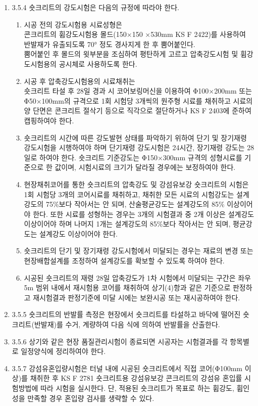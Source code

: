 \begin{enumerate}
\item 3.5.4 숏크리트의 강도시험은 다음의 규정에 따라야 한다.  
\begin{enumerate}
	\item 시공 전의 강도시험용 시료성형은 \\ 콘크리트의 휨강도시험용 몰드(150×150 ×530mm KS F 2422)를 사용하여 반발재가 유출되도록 70° 정도 경사지게 한 후 뿜어붙인다. \\뿜어붙인 후 몰드의 윗부분을 조심하여 평탄하게 고르고 압축강도시험 및 휨강도시험용의 공시체로 사용하도록 한다. 
\item 시공 후 압축강도시험용의 시료채취는 \\ 숏크리트 타설 후 28일 경과 시 코어보링머신을 이용하여 Φ100×200mm 또는 Φ50×100mm의 규격으로 1회 시험당 3개씩의 원주형 시료를 채취하고 시료의 양 단면은 콘크리트 절삭기 등으로 직각으로 절단하거나 KS F 2403에 준하여 캡핑하여야 한다. 
\item 숏크리트의 시간에 따른 강도발현 상태를 파악하기 위하여 단기 및 장기재령 강도시험을 시행하여야 하며 단기재령 강도시험은 24시간, 장기재령 강도는 28일로 하여야 한다. 숏크리트 기준강도는 Φ150×300mm 규격의 성형시료를 기준으로 한 값이며, 시험시료의 크기가 달라질 경우에는 보정하여야 한다.  
\item 현장채취코어를 통한 숏크리트의 압축강도 및 강섬유보강 숏크리트의 시험은 1회 시험당 3개의 코어시료를 채취하고, 채취한 모든 시료의 시험강도는 설계강도의 75\%보다 작아서는 안 되며, 산술평균강도는 설계강도의 85\% 이상이어야 한다. 또한 시료를 성형하는 경우는 3개의 시험결과 중 2개 이상은 설계강도 이상이어야 하며 나머지 1개는 설계강도의 85\%보다 작아서는 안 되며, 평균강도는 설계강도 이상이어야 한다. 
\item 숏크리트의 단기 및 장기재령 강도시험에서 미달되는 경우는 재료의 변경 또는 현장배합설계를 조정하여 설계강도를 확보할 수 있도록 하여야 한다. 
\item 시공된 숏크리트의 재령 28일 압축강도가 1차 시험에서 미달되는 구간은 좌우 5m 범위 내에서 재시험용 코어를 채취하여 상기(4)항과 같은 기준으로 판정하고 재시험결과 판정기준에 미달 시에는 보완시공 또는 재시공하여야 한다. 
\end{enumerate}
\item  3.5.5 숏크리트의 반발률 측정은 현장에서 숏크리트를 타설하고 바닥에 떨어진 숏크리트(반발재)를 수거, 계량하여 다음 식에 의하여 반발률을 산출한다.  
\item  3.5.6 상기와 같은 현장 품질관리시험이 종료되면 시공자는 시험결과를 각 항목별로 일정양식에 정리하여야 한다.  
\item  3.5.7 강섬유혼입량시험은 터널 내에 시공된 숏크리트에서 직접 코어(Φ100mm 이상)를 채취한 후 KS F 2781 숏크리트용 강섬유보강 콘크리트의 강섬유 혼입률 시험방법에 따라 시험을 실시한다. 단, 적용된 숏크리트가 목표로 하는 휨강도, 휨인성을 만족할 경우 혼입량 검사를 생략할 수 있다.   
\end{enumerate}

